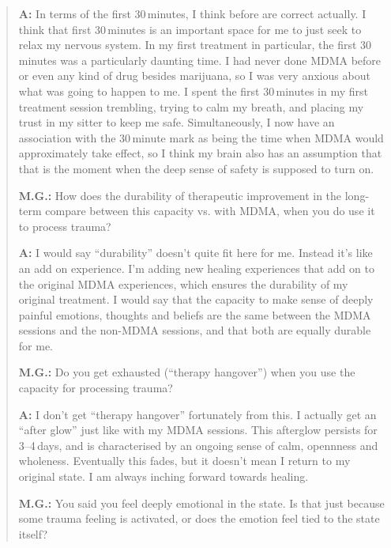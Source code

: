 \documentclass[11pt,oneside]{book}
\begin{document}
\begin{quotation}
    \textbf{A:} In terms of the first 30\,minutes, I think before are correct actually. I think that first 30\,minutes is an important space for me to just seek to relax my nervous system. In my first treatment in particular, the first 30\,minutes was a particularly daunting time. I had never done MDMA before or even any kind of drug besides marijuana, so I was very anxious about what was going to happen to me. I spent the first 30\,minutes in my first treatment session trembling, trying to calm my breath, and placing my trust in my sitter to keep me safe. Simultaneously, I now have an association with the 30\,minute mark as being the time when MDMA would approximately take effect, so I think my brain also has an assumption that that is the moment when the deep sense of safety is supposed to turn on.

    \vspace{\baselineskip}

    \textbf{M.G.:} How does the durability of therapeutic improvement in the long-term compare between this capacity vs. with MDMA, when you do use it to process trauma?

    \textbf{A:} I would say \enquote{durability} doesn't quite fit here for me. Instead it's like an add on experience. I'm adding new healing experiences that add on to the original MDMA experiences, which ensures the durability of my original treatment. I would say that the capacity to make sense of deeply painful emotions, thoughts and beliefs are the same between the MDMA sessions and the non-MDMA sessions, and that both are equally durable for me.

    \vspace{\baselineskip}

    \textbf{M.G.:} Do you get exhausted (\enquote{therapy hangover}) when you use the capacity for processing trauma?

    \textbf{A:} I don't get \enquote{therapy hangover} fortunately from this. I actually get an \enquote{after glow} just like with my MDMA sessions. This afterglow persists for 3--4\,days, and is characterised by an ongoing sense of calm, opennness and wholeness. Eventually this fades, but it doesn't mean I return to my original state. I am always inching forward towards healing.

    \vspace{\baselineskip}

    \textbf{M.G.:} You said you feel deeply emotional in the state. Is that just because some trauma feeling is activated, or does the emotion feel tied to the state itself?


\end{quotation}
\end{document}
